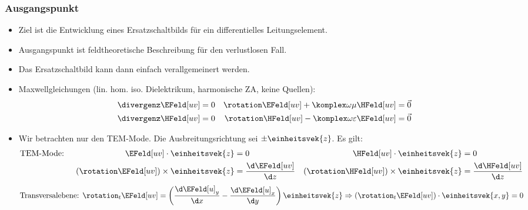 \begin{frame}
  \frametitle{Ausgangspunkt}
  \begin{itemize}[<+->]
  \item Ziel ist die Entwicklung eines \alert{Ersatzschaltbilds} für ein \alert{differentielles Leitungselement}.
  \item Ausgangspunkt ist feldtheoretische Beschreibung für den \alert{verlustlosen Fall}.
  \item Das Ersatzschaltbild kann dann einfach \alert{verallgemeinert} werden.
  \item Maxwellgleichungen (lin. hom. iso. Dielektrikum, harmonische ZA, keine Quellen):
    \begin{align*}
      \divergenz \EFeld[uv] &= 0 & \rotation\EFeld[uv] + \komplex\omega\mu \HFeld[uv] &=\vec{0} \\
      \divergenz \HFeld[uv] &= 0 & \rotation\HFeld[uv] - \komplex\omega\varepsilon \EFeld[uv] &=\vec{0} 
    \end{align*}
  \item Wir betrachten nur den \alert{TEM-Mode}. Die \alert{Ausbreitungsrichtung} sei \(\pm\einheitsvek{z}\). Es gilt:
    \begin{align*}
      \text{TEM-Mode: } && \EFeld[uv]\cdot \einheitsvek{z} &=0 & \HFeld[uv]\cdot \einheitsvek{z} &=0 \\
                        && \left( \rotation \EFeld[uv]\right)\times\einheitsvek{z} &= \frac{\d \EFeld[uv]}{\d z} & \left( \rotation \HFeld[uv]\right)\times\einheitsvek{z} &= \frac{\d \HFeld[uv]}{\d z}
    \end{align*}
    \begin{equation*}
            \text{Transversalebene: }  \rotation_t\EFeld[uv] = \left( \frac{\d \EFeld[u]_y}{\d x}-\frac{\d \EFeld[u]_x}{\d y}\right)\einheitsvek{z} \Rightarrow\left(\rotation_t\EFeld[uv]\right)\cdot\einheitsvek{x,y} =0
    \end{equation*}                                                                                                    
    \end{itemize}
\end{frame}


